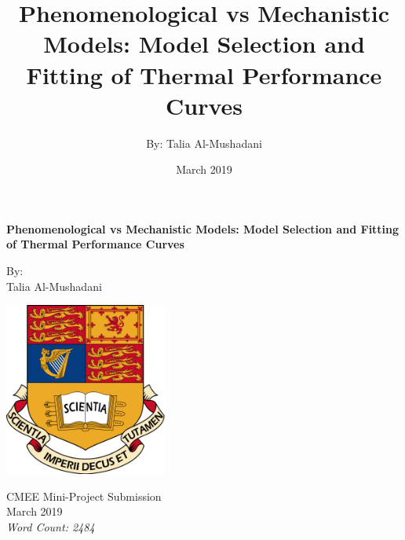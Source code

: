 \documentclass[11pt]{article}
\title{Phenomenological vs Mechanistic Models: Model Selection and Fitting of Thermal Performance Curves}
\author{By: Talia Al-Mushadani}
\date{March 2019}
\begin{document}
\begin{titlepage}
\begin{center}
    \LARGE
    \textbf{Phenomenological vs Mechanistic Models: Model Selection and Fitting of Thermal Performance Curves}
    
    \vspace{1cm}
    By: \\ Talia Al-Mushadani
    
    \vspace{1.3cm}
    \includegraphics[width=0.4\textwidth]{Write_Up_Images/ICLCrest.png}
    
    \vspace{0.3cm}
    CMEE Mini-Project Submission
    \\March 2019
    \\
    \textit{Word Count: 2484}
\end{center}
\end{titlepage}

\tableofcontents
\end{document}
